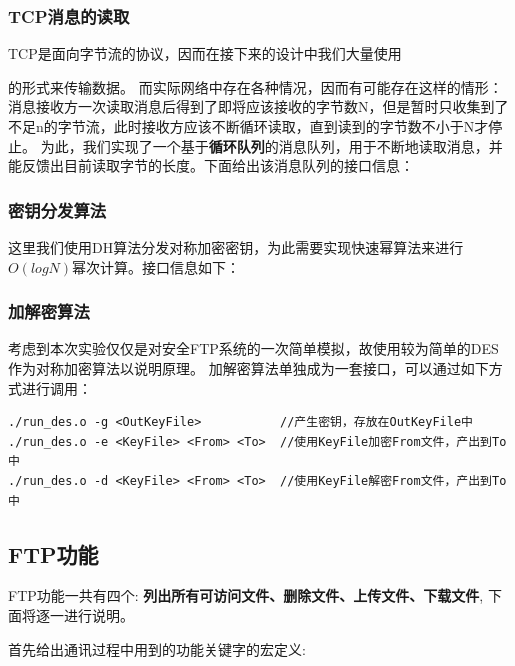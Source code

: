 \documentclass{article}
\begin{document}
\begin{spacing}{2.0}
        \subsubsection{TCP消息的读取}
            TCP是面向字节流的协议，因而在接下来的设计中我们大量使用
            \begin{center}
            \end{center}
            的形式来传输数据。
            而实际网络中存在各种情况，因而有可能存在这样的情形：消息接收方一次读取消息后得到了即将应该接收的字节数N，但是暂时只收集到了不足n的字节流，此时接收方应该不断循环读取，直到读到的字节数不小于N才停止。
            为此，我们实现了一个基于\textbf{循环队列}的消息队列，用于不断地读取消息，并能反馈出目前读取字节的长度。下面给出该消息队列的接口信息：
            

        \subsubsection{密钥分发算法}
            这里我们使用DH算法分发对称加密密钥，为此需要实现快速幂算法来进行$O(logN)$幂次计算。接口信息如下：
            
        \subsubsection{加解密算法}
            考虑到本次实验仅仅是对安全FTP系统的一次简单模拟，故使用较为简单的DES作为对称加密算法以说明原理。
            加解密算法单独成为一套接口，可以通过如下方式进行调用：
        \begin{lstlisting}
./run_des.o -g <OutKeyFile>           //产生密钥，存放在OutKeyFile中
./run_des.o -e <KeyFile> <From> <To>  //使用KeyFile加密From文件，产出到To中
./run_des.o -d <KeyFile> <From> <To>  //使用KeyFile解密From文件，产出到To中
        \end{lstlisting}

    \subsection{FTP功能}
    FTP功能一共有四个: \textbf{列出所有可访问文件、删除文件、上传文件、下载文件}, 下面将逐一进行说明。

    首先给出通讯过程中用到的功能关键字的宏定义:
    


\end{spacing}
\end{document}
